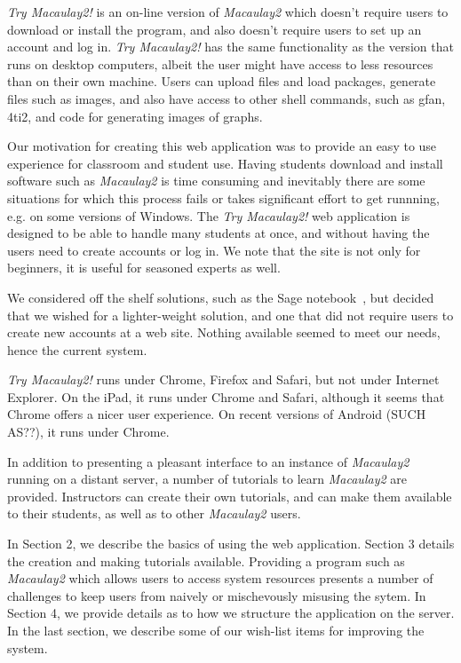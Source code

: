 \documentclass[]{article}
\begin{document}
{\it Try Macaulay2!} is an on-line version of {\it Macaulay2} which
doesn't require users to download or install the program, and also
doesn't require users to set up an account and log in.  {\it Try
  Macaulay2!}  has the same functionality as the version that runs on
desktop computers, albeit the user might have access to less resources
than on their own machine.  Users can upload files and
load packages, generate files such as images, and also have
access to other shell commands, such as gfan, 4ti2, and code for
generating images of graphs.

Our motivation for creating this web application was to provide an
easy to use experience for classroom and student use.  Having students
download and install software such as {\it Macaulay2} is time
consuming and inevitably there are some situations for which this
process fails or takes significant effort to get runnning, e.g. on
some versions of Windows.  The {\it Try Macaulay2!} web application is
designed to be able to handle many students at once, and without
having the users need to create accounts or log in.  We note that the
site is not only for beginners, it is useful for seasoned experts as
well.

We considered off the shelf solutions, such as the Sage
notebook~\cite{sagenotebook}, but decided that we wished for a
lighter-weight solution, and one that did not require users to create
new accounts at a web site.  Nothing available seemed to meet our
needs, hence the current system.

{\it Try Macaulay2!} runs under Chrome, Firefox and Safari, but not
under Internet Explorer.  On the iPad, it runs under Chrome and
Safari, although it seems that Chrome offers a nicer user experience.
On recent versions of Android (SUCH AS??), it runs under Chrome.

In addition to presenting a pleasant interface to an instance of {\it
  Macaulay2} running on a distant server, a number of tutorials to
learn {\it Macaulay2} are provided.  Instructors can create their own
tutorials, and can make them available to their students, as well as
to other {\it Macaulay2} users.  

In Section 2, we describe the basics of using the web application.
Section 3 details the creation and making tutorials available.
Providing a program such as {\it Macaulay2} which allows users to
access system resources presents a number of challenges to keep users
from naively or mischevously misusing the sytem.  In Section 4, we
provide details as to how we structure the application on the server.
In the last section, we describe some of our wish-list items for
improving the system.
\end{document}

